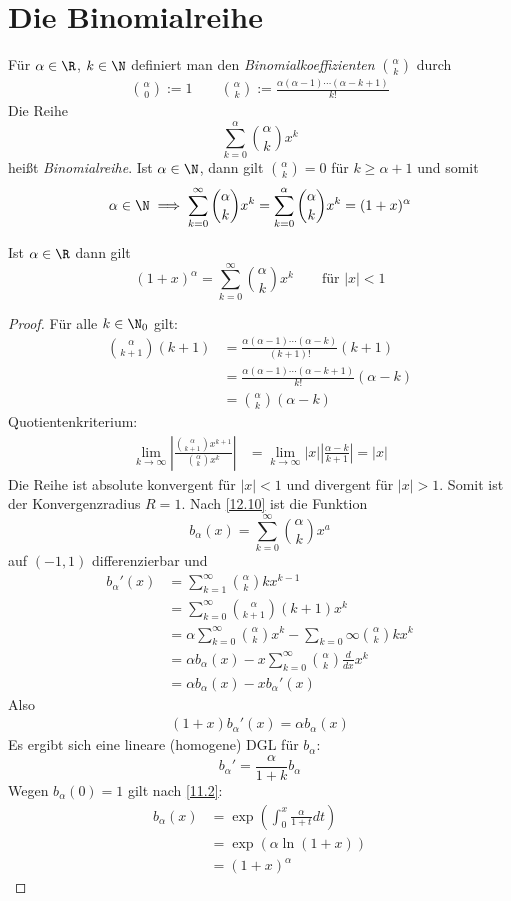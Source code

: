 \documentclass{mycourse}
\begin{document}
\section{Die Binomialreihe}

Für $\alpha\in\R$, $k\in\N$ definiert man den \emph{Binomialkoeffizienten} $\binom{\alpha}{k}$ durch
\begin{align*}
\binom{\alpha}{0}:= 1 \qquad
\binom{\alpha}{k}:= \frac {\alpha(\alpha-1)\dotsb(\alpha-k+1)}{k!}
\end{align*}
Die Reihe
\[
\sum_{k=0}^\alpha\binom{\alpha}{k}x^k
\]
heißt \emph{Binomialreihe}.
Ist $\alpha\in \N$, dann gilt
$\binom{\alpha}k = 0$ für $k\ge \alpha +1$ und somit
\[
\alpha\in\N \implies \sum_{k=0}^\infty\binom\alpha kx^k=\sum_{k=0}^\alpha\binom \alpha kx^k=(1+x)^\alpha
\]
\setcounter{thm}{14}
\begin{thm}
\label{12.15}
	Ist $\alpha\in\R$ dann gilt
\[
(1+x)^\alpha=\sum_{k=0}^\infty\binom\alpha kx^k \qquad \text{für }|x|<1
\]
\begin{proof}
Für alle $k\in\N_0$ gilt:
\begin{align*}
\binom{\alpha}{k+1}(k+1)&=\frac{\alpha(\alpha-1)\dotsb(\alpha-k)}{(k+1)!}(k+1)\\
&=\frac {\alpha(\alpha-1)\dotsb(\alpha-k+1)}{k!}(\alpha-k)\\
&=\binom{\alpha}k(\alpha-k)
\end{align*}
Quotientenkriterium:
\begin{align*}
\lim_{k\to\infty}\left|\frac{\binom\alpha {k+1}x^{k+1}}{\binom{\alpha}kx^k}\right|&=
\lim_{k\to\infty}|x|\left|\frac{\alpha-k}{k+1}\right|=|x|
\end{align*}
Die Reihe ist absolute konvergent für $|x|<1$ und divergent für $|x|>1$.
Somit ist der Konvergenzradius $R=1$.
Nach \ref{12.10} ist die Funktion
\[
b_\alpha(x)=\sum_{k=0}^\infty\binom\alpha k x^a
\]
auf $(-1,1)$ differenzierbar und
\begin{align*}
b_\alpha'(x)&=\sum_{k=1}^\infty\binom\alpha kkx^{k-1}\\
&=\sum_{k=0}^\infty\binom\alpha{k+1}(k+1)x^k\\
&=\alpha\sum_{k=0}^\infty\binom\alpha kx^k-\sum_{k=0}\infty\binom\alpha kkx^k\\
&= \alpha b_\alpha(x) - x\sum_{k=0}^\infty\binom \alpha k\frac d{dx}x^k\\
&= \alpha b_\alpha(x)-xb_\alpha'(x)
\end{align*}
Also
\begin{align*}
(1+x)b_\alpha'(x)=\alpha b_\alpha(x)
\end{align*}
Es ergibt sich eine lineare (homogene) DGL für $b_\alpha$:
\[
b_\alpha'=\frac \alpha{1+k}b_\alpha
\]
Wegen $b_\alpha(0)=1$ gilt nach \ref{11.2}:
\begin{align*}
b_\alpha(x)&=\exp\left(\int_0^x\frac\alpha{1+t}dt\right)\\
&=\exp(\alpha\ln(1+x))\\
&=(1+x)^\alpha
\end{align*}
\end{proof}


\end{thm}
\end{document}
